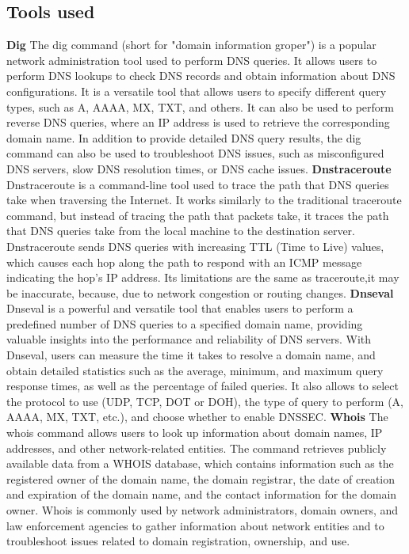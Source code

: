\documentclass[eng]{class}
\begin{document}
\subsection{Tools used}
\textbf{Dig} \newline
The dig command (short for "domain information groper") is a popular network administration tool used to perform DNS queries.
It allows users to perform DNS lookups to check DNS records and obtain information about DNS configurations.
It is a versatile tool that allows users to specify different query types, such as A, AAAA, MX, TXT, and others.
It can also be used to perform reverse DNS queries, where an IP address is used to retrieve the corresponding domain name.
In addition to provide detailed DNS query results, the dig command can also be used to troubleshoot DNS issues, such as misconfigured DNS servers,
slow DNS resolution times, or DNS cache issues.\newline
\newline
\textbf{Dnstraceroute} \newline
Dnstraceroute is a command-line tool used to trace the path that DNS queries take when traversing the Internet.
It works similarly to the traditional traceroute command, but instead of tracing the path that packets take,
it traces the path that DNS queries take from the local machine to the destination server.
Dnstraceroute sends DNS queries with increasing TTL (Time to Live) values,
which causes each hop along the path to respond with an ICMP message indicating the hop's IP address.
Its limitations are the same as traceroute,it may be inaccurate, because, due to network congestion or routing changes.\newline
\newline
\textbf{Dnseval} \newline
Dnseval is a powerful and versatile tool that enables users to perform a predefined number of DNS queries to a specified domain name,
providing valuable insights into the performance and reliability of DNS servers.
With Dnseval, users can measure the time it takes to resolve a domain name, and obtain detailed statistics such as the average, minimum,
and maximum query response times, as well as the percentage of failed queries.
It also allows  to select the protocol to use (UDP, TCP, DOT or DOH), the type of query to perform (A, AAAA, MX, TXT, etc.),
and choose whether to enable DNSSEC.\newline
\newline
\textbf{Whois} \newline
The whois command allows users to look up information about domain names, IP addresses, and other network-related entities.
The command retrieves publicly available data from a WHOIS database, which contains information such as the registered owner of the domain name,
the domain registrar, the date of creation and expiration of the domain name, and the contact information for the domain owner.
Whois is commonly used by network administrators, domain owners, and law enforcement agencies to gather information
about network entities and to troubleshoot issues related to domain registration, ownership, and use.\newline
\end{document}
